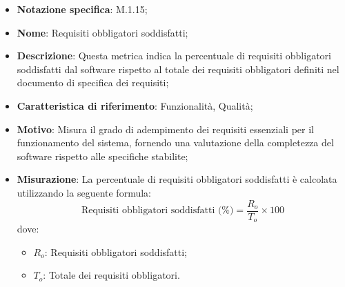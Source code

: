 \begin{itemize}
    \item \textbf{Notazione specifica}: M.1.15;
    \item \textbf{Nome}: Requisiti obbligatori soddisfatti;
    \item \textbf{Descrizione}: Questa metrica indica la percentuale di requisiti obbligatori soddisfatti dal software rispetto al totale dei requisiti obbligatori definiti nel documento di specifica dei requisiti;
    \item \textbf{Caratteristica di riferimento}: Funzionalità, Qualità;
    \item \textbf{Motivo}: Misura il grado di adempimento dei requisiti essenziali per il funzionamento del sistema, fornendo una valutazione della completezza del software rispetto alle specifiche stabilite;
    \item \textbf{Misurazione}: La percentuale di requisiti obbligatori soddisfatti è calcolata utilizzando la seguente formula:
    \[
    \text{Requisiti obbligatori soddisfatti (\%)} = \frac{R_{o}}{T_{o}} \times 100
    \]
    dove:
    \begin{itemize}
        \item $R_{o}$: Requisiti obbligatori soddisfatti;
        \item $T_{o}$: Totale dei requisiti obbligatori.
    \end{itemize}
\end{itemize}
